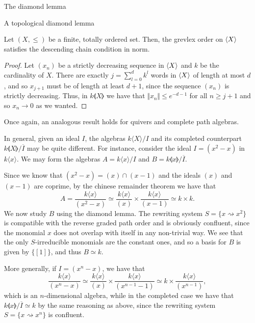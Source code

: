 \begin{chapter}{The diamond lemma}
\begin{section}{A topological diamond lemma}
\begin{lemma}Let $(X,\leq)$ be a finite, totally ordered set. Then, the grevlex order on $\langle X\rangle$ satisfies the descending chain condition in norm.
\end{lemma}
\begin{proof} Let $(x_n)$ be a strictly decreasing sequence in $\langle X\rangle$ and $k$ be the cardinality of $X$. There are exactly $j=\sum_{l=0}^d k^l$ words in $\langle X\rangle$ of length at most $d$, and so $x_{j+1}$ must be of length at least $d+1$, since the sequence $(x_n)$ is strictly decreasing. Thus, in $k\llangle X\rrangle$ we have that $\Vert x_{n}\Vert\leq e^{-d-1}$ for all $n\geq j+1$ and so $x_n\rightarrow 0$ as we wanted.
\end{proof}

Once again, an analogous result holds for quivers and complete path algebras.

\begin{exmp} In general, given an ideal $I$, the algebras $k\langle X\rangle/I$ and its completed counterpart $k\llangle X\rrangle/\overline{I}$ may be quite different. For instance, consider the ideal $I=(x^2-x)$ in $k\langle x \rangle$. We may form the algebras $A=k\langle x\rangle/I$ and $B=k\llangle x\rrangle/\overline{I}$.

Since we know that $(x^2-x)=(x)\cap(x-1)$ and the ideals $(x)$ and $(x-1)$ are coprime, by the chinese remainder theorem we have that
\[A=\frac{k\langle x\rangle}{(x^2-x)}\simeq \frac{k\langle x\rangle}{(x)} \times \frac{k\langle x\rangle}{(x-1)}\simeq k\times k.\]
We now study $B$ using the diamond lemma. The rewriting system $S=\{x\rightsquigarrow x^2\}$ is compatible with the reverse graded path order and is obviously confluent, since the monomial $x$ does not overlap with itself in any non-trivial way. We see that the only $S$-irreducible monomials are the constant ones, and so a basis for $B$ is given by $\{[1]\}$, and thus $B\simeq k$.

More generally, if $I=(x^n-x)$, we have that
\[\frac{k\langle x\rangle}{(x^n-x)} \simeq \frac{k\langle x\rangle}{(x)}\times \frac{k\langle x\rangle}{(x^{n-1}-1)}\simeq k \times \frac{k\langle x\rangle}{(x^{n-1})},\]
which is an $n$-dimensional algebra, while in the completed case we have that $k\llangle x\rrangle/\overline{I}\simeq k$ by the same reasoning as above, since the rewriting system $S=\{x\rightsquigarrow x^n\}$ is confluent.
\end{exmp}
\end{section}
\end{chapter}